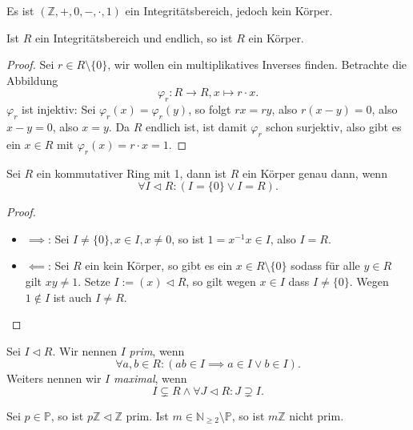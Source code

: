 \begin{example}
    Es ist $(\mathbb{Z}, +, 0, -, \cdot, 1)$ ein Integritätsbereich, jedoch kein Körper.
\end{example}

\begin{proposition}
    Ist $R$ ein Integritätsbereich und endlich, so ist $R$ ein Körper.
\end{proposition}

\begin{proof}
    Sei $r \in R \setminus \{0\}$, wir wollen ein multiplikatives Inverses finden. Betrachte die Abbildung
    $$ \varphi_r : R \to R, x \mapsto r \cdot x. $$
    $\varphi_r$ ist injektiv: Sei $\varphi_r(x) = \varphi_r(y)$, so folgt $rx = ry$, also $r(x-y) = 0$, also $x-y=0$, also $x=y$.
    Da $R$ endlich ist, ist damit $\varphi_r$ schon surjektiv, also gibt es ein $x \in R$ mit $\varphi_r(x) = r \cdot x = 1$.
\end{proof}

\begin{proposition}
    Sei $R$ ein kommutativer Ring mit 1, dann ist $R$ ein Körper genau dann, wenn
    $$ \forall I \vartriangleleft R: (I = \{0\} \lor I = R). $$
\end{proposition}

\begin{proof}{\ }
    \begin{itemize}
        \item $\implies$: Sei $I \neq \{0\}, x \in I, x \neq 0$, so ist $1 = x^{-1} x \in I$, also $I = R$.
        \item $\impliedby$: Sei $R$ ein kein Körper, so gibt es ein $x \in R \setminus \{0\}$ sodass für alle $y \in R$ gilt $xy \neq 1$. Setze $I := (x) \vartriangleleft R$, so gilt wegen $x \in I$ dass $I \neq \{0\}$. Wegen $1 \notin I$ ist auch $I \neq R$.
    \end{itemize}
\end{proof}

\begin{definition}
    Sei $I \vartriangleleft R$. Wir nennen $I$ \emph{prim}, wenn
    $$ \forall a, b \in R: (ab \in I \implies a \in I \lor b \in I). $$
    Weiters nennen wir $I$ \emph{maximal}, wenn
    $$ I \subsetneq R \land \forall J \vartriangleleft R : J \supsetneq I. $$
\end{definition}

\begin{example}
    Sei $p \in \mathbb{P}$, so ist $p \mathbb{Z} \vartriangleleft \mathbb{Z}$ prim. Ist $m \in \mathbb{N}_{\geq 2} \setminus \mathbb{P}$, so ist $m \mathbb{Z}$ nicht prim.
\end{example}

